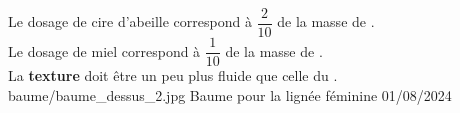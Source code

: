 {%
    Le dosage de cire d'abeille correspond à $\dfrac{2}{10}$ de la masse de \macerat.\\
    Le dosage de miel correspond à $\dfrac{1}{10}$ de la masse de \macerat.\\
    La \textbf{texture} doit être un peu plus fluide que celle du .
}
{%
    baume/baume_dessus_2.jpg    
}
{%
    Baume pour la lignée féminine
}
{%
    01/08/2024
}